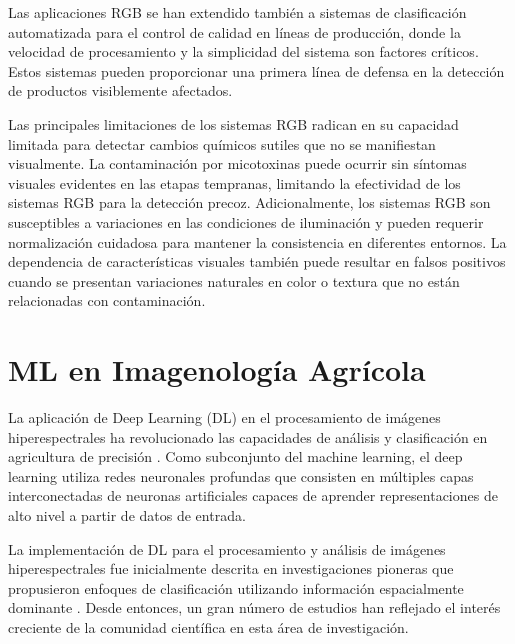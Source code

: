 \vspace{5mm}

Las aplicaciones RGB se han extendido también a sistemas de clasificación automatizada para el control de calidad en líneas de producción, donde la velocidad de procesamiento y la simplicidad del sistema son factores críticos. Estos sistemas pueden proporcionar una primera línea de defensa en la detección de productos visiblemente afectados.

\vspace{5mm}

Las principales limitaciones de los sistemas RGB radican en su capacidad limitada para detectar cambios químicos sutiles que no se manifiestan visualmente. La contaminación por micotoxinas puede ocurrir sin síntomas visuales evidentes en las etapas tempranas, limitando la efectividad de los sistemas RGB para la detección precoz. Adicionalmente, los sistemas RGB son susceptibles a variaciones en las condiciones de iluminación y pueden requerir normalización cuidadosa para mantener la consistencia en diferentes entornos. La dependencia de características visuales también puede resultar en falsos positivos cuando se presentan variaciones naturales en color o textura que no están relacionadas con contaminación.

\section{ML en Imagenología Agrícola}

La aplicación de Deep Learning (DL) en el procesamiento de imágenes hiperespectrales ha revolucionado las capacidades de análisis y clasificación en agricultura de precisión \cite{PAOLETTI2019279}. Como subconjunto del machine learning, el deep learning utiliza redes neuronales profundas que consisten en múltiples capas interconectadas de neuronas artificiales capaces de aprender representaciones de alto nivel a partir de datos de entrada.

\vspace{5mm}

La implementación de DL para el procesamiento y análisis de imágenes hiperespectrales fue inicialmente descrita en investigaciones pioneras que propusieron enfoques de clasificación utilizando información espacialmente dominante \cite{chen2014deep}. Desde entonces, un gran número de estudios han reflejado el interés creciente de la comunidad científica en esta área de investigación.

\vspace{5mm}


